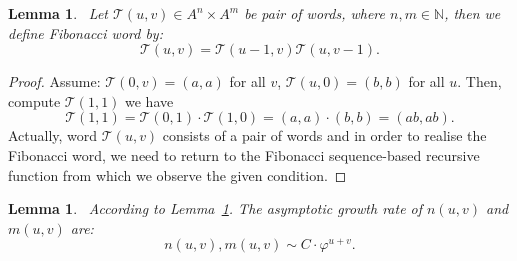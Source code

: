 \documentclass[12pt, a4paper]{article}
\newtheorem{lemma}[theorem]{Lemma}
\begin{document}
\begin{lemma}~\label{newfibword}
Let $\mathscr{T}(u,v)\in A^n\times A^m$ be pair of words, where $n,m\in \mathbb{N}$, then we define Fibonacci word by: 
\[
\mathscr{T}(u,v)=\mathscr{T}(u-1,v)\mathscr{T}(u,v-1).
\]
\end{lemma}
\begin{proof}
Assume: $\mathscr{T}(0, v) = (a, a)$ for all $v$,  $\mathscr{T}(u, 0) = (b, b)$ for all $u$. Then, compute $\mathscr{T}(1,1)$ we have   
\[
\mathscr{T}(1,1) = \mathscr{T}(0,1) \cdot \mathscr{T}(1,0) = (a, a) \cdot (b, b) = (ab, ab).
\]
Actually, word $\mathscr{T}(u,v)$ consists of a pair of words and in order to realise the Fibonacci word, we need to return to the Fibonacci sequence-based recursive function from which we observe the given condition.
\end{proof}
\begin{lemma}~\label{newprove}
According to Lemma~\ref{newfibword}. The asymptotic growth rate of $n(u,v)$ and $m(u,v)$ are: 
\[
n(u, v), m(u, v) \sim C \cdot \varphi^{u+v}.
\]
\end{lemma}
\end{document}
